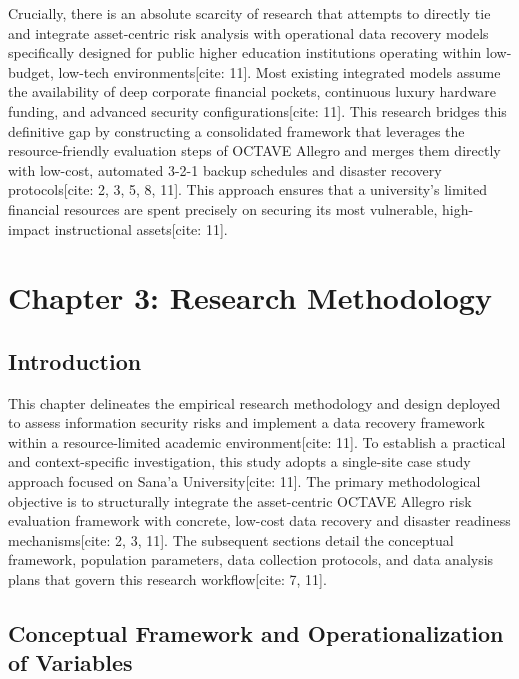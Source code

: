 \documentclass[journal,onecolumn,12pt,twoside]{IEEEtran}
\begin{document}
	Crucially, there is an absolute scarcity of research that attempts to directly tie and integrate asset-centric risk analysis with operational data recovery models specifically designed for public higher education institutions operating within low-budget, low-tech environments[cite: 11]. Most existing integrated models assume the availability of deep corporate financial pockets, continuous luxury hardware funding, and advanced security configurations[cite: 11]. This research bridges this definitive gap by constructing a consolidated framework that leverages the resource-friendly evaluation steps of OCTAVE Allegro and merges them directly with low-cost, automated 3-2-1 backup schedules and disaster recovery protocols[cite: 2, 3, 5, 8, 11]. This approach ensures that a university's limited financial resources are spent precisely on securing its most vulnerable, high-impact instructional assets[cite: 11].
	
	
	\newpage
	\section{Chapter 3: Research Methodology}
	\label{sec:methodology}
	
	\subsection{Introduction}
	\label{subsec:method_intro}
	This chapter delineates the empirical research methodology and design deployed to assess information security risks and implement a data recovery framework within a resource-limited academic environment[cite: 11]. To establish a practical and context-specific investigation, this study adopts a single-site case study approach focused on Sana'a University[cite: 11]. The primary methodological objective is to structurally integrate the asset-centric OCTAVE Allegro risk evaluation framework with concrete, low-cost data recovery and disaster readiness mechanisms[cite: 2, 3, 11]. The subsequent sections detail the conceptual framework, population parameters, data collection protocols, and data analysis plans that govern this research workflow[cite: 7, 11].
	
	\subsection{Conceptual Framework and Operationalization of Variables}
	
\end{document}
